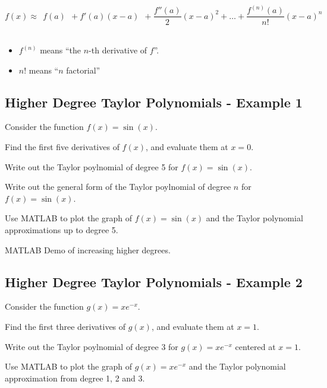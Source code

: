 $$ f(x) \approx ~~f(a) ~~+ f'(a) (x-a) ~~+ \frac{f''(a)}{2} (x-a)^2 + \ldots 
+ \frac{f^{(n)}(a)}{n!} (x-a)^n$$   \\

\begin{itemize}
\item $f^{(n)}$ means ``the $n$-th derivative of $f$''. \\
\item $n!$ means ``$n$ factorial''
\end{itemize}

\newpage
\subsection*{Higher Degree Taylor Polynomials - Example 1}

Consider the function $f(x) = \sin(x)$.

\problem Find the first five derivatives of $f(x)$, and evaluate them at $x=0$.


\newpage

\problem Write out the Taylor poylnomial of degree 5 for
$f(x) = \sin(x)$.

\vfill

\problem Write out the general form of the Taylor poylnomial of degree
$n$ for $f(x) = \sin(x)$.

\vfill

\newpage

\problem Use MATLAB to plot the graph of $f(x) = \sin(x)$ and the
Taylor polynomial approximations up to degree 5.

\newpage

MATLAB Demo of increasing higher degrees.


\subsection*{Higher Degree Taylor Polynomials - Example 2}

Consider the function $g(x) = x e^{-x}$.

\problem Find the first three derivatives of $g(x)$, and evaluate them
at $x=1$.


\newpage

\problem Write out the Taylor poylnomial of degree 3 for
$g(x) = x e^{-x}$ centered at $x=1$.

\vfill

\newpage

\problem Use MATLAB to plot the graph of $g(x) = x e^{-x}$ and the
Taylor polynomial approximation from degree 1, 2 and 3.

